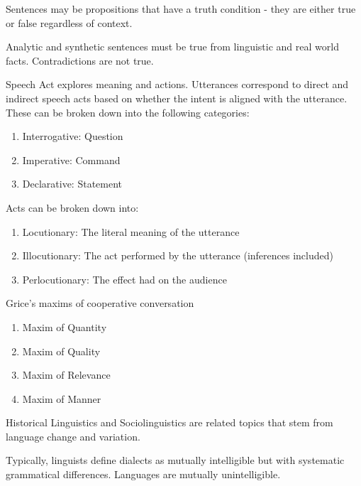 \documentclass[12pt]{article}
\begin{document}
Sentences may be propositions that have a truth condition - they are either true or false regardless of context.

Analytic and synthetic sentences must be true from linguistic and real world facts. Contradictions are not true.

Speech Act explores meaning and actions. Utterances correspond to direct and indirect speech acts based on whether the intent is aligned with the utterance. These can be broken down into the following categories:
\begin{enumerate}
\item Interrogative: Question
\item Imperative: Command
\item Declarative: Statement
\end{enumerate}
Acts can be broken down into:
\begin{enumerate}
\item Locutionary: The literal meaning of the utterance
\item Illocutionary: The act performed by the utterance (inferences included)
\item Perlocutionary: The effect had on the audience
\end{enumerate}

Grice's maxims of cooperative conversation
\begin{enumerate}
\item Maxim of Quantity
\item Maxim of Quality
\item Maxim of Relevance
\item Maxim of Manner
\end{enumerate}

Historical Linguistics and Sociolinguistics are related topics that stem from language change and variation.

Typically, linguists define dialects as mutually intelligible but with systematic grammatical differences. Languages are mutually unintelligible.
\end{document}
